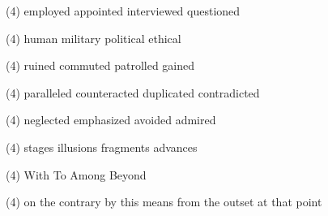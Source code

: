\begin{tasks}(4)
	\task employed
	\task appointed
	\task interviewed
	\task questioned
\end{tasks}
\item
\begin{tasks}(4)
	\task human
	\task military
	\task political
	\task ethical
\end{tasks}
\item
\begin{tasks}(4)
	\task ruined
	\task commuted
	\task patrolled
	\task gained
\end{tasks}
\item
\begin{tasks}(4)
	\task paralleled
	\task counteracted
	\task duplicated
	\task contradicted
\end{tasks}
\item
\begin{tasks}(4)
	\task neglected
	\task emphasized
	\task avoided
	\task admired
\end{tasks}
\item
\begin{tasks}(4)
	\task stages
	\task illusions
	\task fragments
	\task advances
\end{tasks}
\item
\begin{tasks}(4)
	\task With
	\task To
	\task Among
	\task Beyond
\end{tasks}
\item
\begin{tasks}(4)
	\task on the contrary
	\task by this means
	\task from the outset
	\task at that point
\end{tasks}